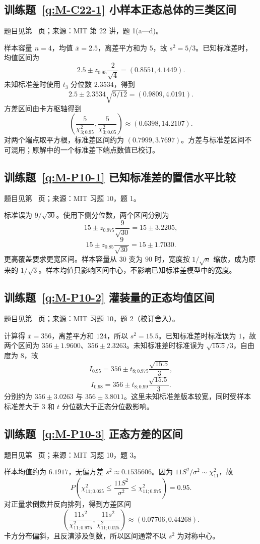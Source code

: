 \subsection*{训练题~\ref{q:M-C22-1} 小样本正态总体的三类区间}\label{a:M-C22-1}{\small 题目见第~\pageref{q:M-C22-1} 页；来源：MIT 第 22 讲，题 1(a—d)。}
\begin{solve}样本容量 $n=4$，均值 $\overline x=2.5$，离差平方和为 $5$，故 $s^2=5/3$。已知标准差时，均值区间为\[2.5\pm z_{0.95}\frac2{\sqrt4}=(0.8551,4.1449).\]未知标准差时使用 $t_3$ 分位数 $2.3534$，得到\[2.5\pm2.3534\sqrt{5/12}=(0.9809,4.0191).\]方差区间由卡方枢轴得到\[\left(\frac5{\chi^2_{3;0.95}},\frac5{\chi^2_{3;0.05}}\right)\approx(0.6398,14.2107).\]对两个端点取平方根，标准差区间约为 $(0.7999,3.7697)$。方差与标准差区间不可混用；原解中的一个标准差下端点数值已校订。\end{solve}

\subsection*{训练题~\ref{q:M-P10-1} 已知标准差的置信水平比较}\label{a:M-P10-1}{\small 题目见第~\pageref{q:M-P10-1} 页；来源：MIT 习题 10，题 1。}
\begin{solve}标准误为 $9/\sqrt{30}$。使用下侧分位数，两个区间分别为\[15\pm z_{0.975}\frac9{\sqrt{30}}=15\pm3.2205,\]\[15\pm z_{0.85}\frac9{\sqrt{30}}=15\pm1.7030.\]更高覆盖要求更宽区间。样本容量从 $30$ 变为 $90$ 时，宽度按 $1/\sqrt n$ 缩放，成为原来的 $1/\sqrt3$。样本均值只影响区间中心，不影响已知标准差模型中的宽度。\end{solve}

\subsection*{训练题~\ref{q:M-P10-2} 灌装量的正态均值区间}\label{a:M-P10-2}{\small 题目见第~\pageref{q:M-P10-2} 页；来源：MIT 习题 10，题 2（校订舍入）。}
\begin{solve}计算得 $\overline x=356$，离差平方和 $124$，所以 $s^2=15.5$。已知标准差时标准误为 $1$，故两个区间为 $356\pm1.9600$、$356\pm2.3263$。未知标准差时标准误为 $\sqrt{15.5}/3$，自由度为 $8$，故\[I_{0.95}=356\pm t_{8;0.975}\frac{\sqrt{15.5}}3,\]\[I_{0.98}=356\pm t_{8;0.99}\frac{\sqrt{15.5}}3.\]分别约为 $356\pm3.0263$ 与 $356\pm3.8011$。这里未知标准差版本较宽，同时受样本标准差大于 $3$ 和 $t$ 分位数大于正态分位数影响。\end{solve}

\subsection*{训练题~\ref{q:M-P10-3} 正态方差的区间}\label{a:M-P10-3}{\small 题目见第~\pageref{q:M-P10-3} 页；来源：MIT 习题 10，题 3。}
\begin{solve}样本均值约为 $6.1917$，无偏方差 $s^2\approx0.1535606$。因为 $11S^2/\sigma^2\sim\chi^2_{11}$，故\[P\left(\chi^2_{11;0.025}\le\frac{11S^2}{\sigma^2}\le\chi^2_{11;0.975}\right)=0.95.\]对正量求倒数并反向排列，得到方差区间\[\left(\frac{11s^2}{\chi^2_{11;0.975}},\frac{11s^2}{\chi^2_{11;0.025}}\right)\approx(0.07706,0.44268).\]卡方分布偏斜，且反演涉及倒数，所以区间通常不以 $s^2$ 为对称中心。\end{solve}

